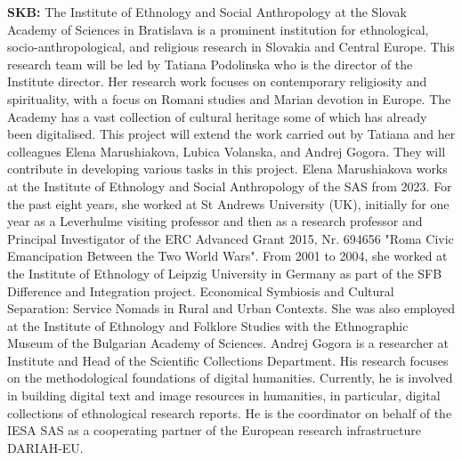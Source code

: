 \item \textbf{SKB:} The Institute of Ethnology and Social Anthropology at the Slovak Academy of Sciences in Bratislava is a prominent institution for ethnological, socio-anthropological, and religious research in Slovakia and Central Europe. This research team will be led by Tatiana Podolinska who is the director of the Institute director. Her research work focuses on contemporary religiosity and spirituality, with a focus on Romani studies and Marian devotion in Europe. The Academy has a vast collection of cultural heritage some of which has already been digitalised. This project will extend the work carried out by Tatiana and her colleagues Elena Marushiakova, Lubica Volanska, and Andrej Gogora. They will contribute in developing various tasks in this project. Elena Marushiakova works at the Institute of Ethnology and Social Anthropology of the SAS from 2023. For the past eight years, she worked at St Andrews University (UK), initially for one year as a Leverhulme visiting professor and then as a research professor and Principal Investigator of the ERC Advanced Grant 2015, Nr. 694656 "Roma Civic Emancipation Between the Two World Wars". From 2001 to 2004, she worked at the Institute of Ethnology of Leipzig University in Germany as part of the SFB Difference and Integration project. Economical Symbiosis and Cultural Separation: Service Nomads in Rural and Urban Contexts. She was also employed at the Institute of Ethnology and Folklore Studies with the Ethnographic Museum of the Bulgarian Academy of Sciences. Andrej Gogora is a researcher at Institute and Head of the Scientific Collections Department. His research focuses on the methodological foundations of digital humanities. Currently, he is involved in building digital text and image resources in humanities, in particular, digital collections of ethnological research reports. He is the coordinator on behalf of the IESA SAS as a cooperating partner of the European research infrastructure DARIAH-EU.


